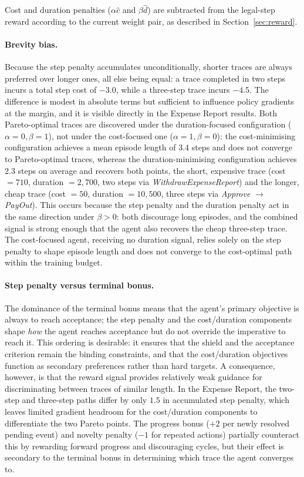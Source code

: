 Cost and duration penalties ($\alpha\hat{c}$ and $\beta\hat{d}$) are subtracted from the legal-step reward according to the current weight pair, as described in Section~\ref{sec:reward}.

\paragraph{Brevity bias.} Because the step penalty accumulates unconditionally, shorter traces are always preferred over longer ones, all else being equal: a trace completed in two steps incurs a total step cost of $-3.0$, while a three-step trace incurs $-4.5$. The difference is modest in absolute terms but sufficient to influence policy gradients at the margin, and it is visible directly in the Expense Report results. Both Pareto-optimal traces are discovered under the duration-focused configuration ($\alpha=0, \beta=1$), not under the cost-focused one ($\alpha=1, \beta=0$): the cost-minimising configuration achieves a mean episode length of 3.4 steps and does not converge to Pareto-optimal traces, whereas the duration-minimising configuration achieves 2.3 steps on average and recovers both points, the short, expensive trace (cost $= 710$, duration $= 2{,}700$, two steps via \textit{WithdrawExpenseReport}) and the longer, cheap trace (cost $= 50$, duration $= 10{,}500$, three steps via \textit{Approve} $\to$ \textit{PayOut}). This occurs because the step penalty and the duration penalty act in the same direction under $\beta > 0$: both discourage long episodes, and the combined signal is strong enough that the agent also recovers the cheap three-step trace. The cost-focused agent, receiving no duration signal, relies solely on the step penalty to shape episode length and does not converge to the cost-optimal path within the training budget.

\paragraph{Step penalty versus terminal bonus.} The dominance of the terminal bonus means that the agent's primary objective is always to reach acceptance; the step penalty and the cost/duration components shape \emph{how} the agent reaches acceptance but do not override the imperative to reach it. This ordering is desirable: it ensures that the shield and the acceptance criterion remain the binding constraints, and that the cost/duration objectives function as secondary preferences rather than hard targets. A consequence, however, is that the reward signal provides relatively weak guidance for discriminating between traces of similar length. In the Expense Report, the two-step and three-step paths differ by only $1.5$ in accumulated step penalty, which leaves limited gradient headroom for the cost/duration components to differentiate the two Pareto points. The progress bonus ($+2$ per newly resolved pending event) and novelty penalty ($-1$ for repeated actions) partially counteract this by rewarding forward progress and discouraging cycles, but their effect is secondary to the terminal bonus in determining which trace the agent converges to.

